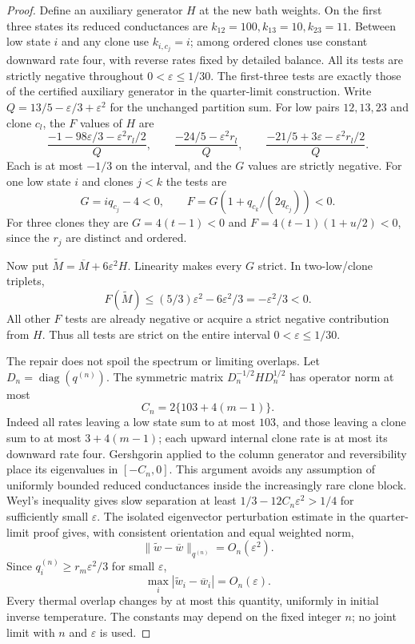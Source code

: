 \documentclass[11pt]{article}
\begin{document}
\begin{proof}
Define an auxiliary generator $H$ at the new bath weights. On the first
three states its reduced conductances are
$k_{12}=100,k_{13}=10,k_{23}=11$. Between low state $i$ and any clone
use $k_{i,c_j}=i$; among ordered clones use constant downward rate four,
with reverse rates fixed by detailed balance. All its tests are strictly
negative throughout $0<\varepsilon\leq1/30$.
The first-three tests are exactly those of the certified auxiliary
generator in the quarter-limit construction. Write
$Q=13/5-\varepsilon/3+\varepsilon^2$ for the unchanged partition sum.
For low pairs $12,13,23$ and clone $c_l$, the $F$ values of $H$ are
\[
\frac{-1-98\varepsilon/3-\varepsilon^2r_l/2}{Q},\qquad
\frac{-24/5-\varepsilon^2r_l}{Q},\qquad
\frac{-21/5+3\varepsilon-\varepsilon^2r_l/2}{Q}.
\]
Each is at most $-1/3$ on the interval, and the $G$ values are
strictly negative. For one low state $i$ and clones $j<k$ the tests are
\[
G=i q_{c_j}-4<0,\qquad F=G(1+q_{c_k}/(2q_{c_j}))<0.
\]
For three clones they are $G=4(t-1)<0$ and
$F=4(t-1)(1+u/2)<0$, since the $r_j$ are distinct and ordered.

Now put $\widetilde M=\overline M+6\varepsilon^2H$.
Linearity makes every $G$ strict. In two-low/clone triplets,
\[
F(\widetilde M)\leq(5/3)\varepsilon^2
                 -6\varepsilon^2/3=-\varepsilon^2/3<0.
\]
All other $F$ tests are already negative or acquire a strict negative
contribution from $H$. Thus all tests are strict on the entire
interval $0<\varepsilon\leq1/30$.

The repair does not spoil the spectrum or limiting overlaps. Let
$D_n=\operatorname{diag}(q^{(n)})$.
The symmetric matrix $D_n^{-1/2}HD_n^{1/2}$ has operator norm at most
\[
C_n=2\{103+4(m-1)\}.
\]
Indeed all rates leaving a low state sum to at most $103$, and those
leaving a clone sum to at most $3+4(m-1)$; each upward internal clone
rate is at most its downward rate four. Gershgorin applied to the
column generator and reversibility place its eigenvalues in
$[-C_n,0]$. This argument avoids any assumption of uniformly bounded
reduced conductances inside the increasingly rare clone block.
Weyl's inequality gives slow separation at least
$1/3-12C_n\varepsilon^2>1/4$ for sufficiently small $\varepsilon$.
The isolated eigenvector perturbation estimate in the quarter-limit
proof gives, with consistent orientation and equal weighted norm,
\[
\|\widetilde w-\overline w\|_{q^{(n)}}=O_n(\varepsilon^2).
\]
Since $q_i^{(n)}\geq r_m\varepsilon^2/3$ for small $\varepsilon$,
\[
\max_i|\widetilde w_i-\overline w_i|=O_n(\varepsilon).
\]
Every thermal overlap changes by at most this quantity, uniformly in
initial inverse temperature. The constants may depend on the fixed
integer $n$; no joint limit with $n$ and $\varepsilon$ is used.


\end{proof}
\end{document}
